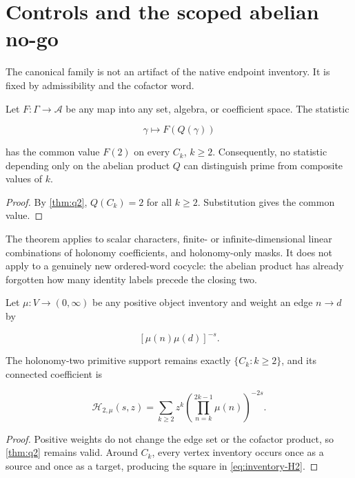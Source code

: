 \section{Controls and the scoped abelian no-go}
\label{sec:controls}

The canonical family is not an artifact of the native endpoint inventory.
It is fixed by admissibility and the cofactor word.

\begin{theorem}
\label{thm:blindness}
Let \(F:\Gamma\to\mathcal A\) be any map into any set, algebra, or
coefficient space.  The statistic

\[
 \gamma\longmapsto F(Q(\gamma))
\]

has the common value \(F(2)\) on every \(C_k\), \(k\ge2\).  Consequently, no
statistic depending only on the abelian product \(Q\) can distinguish prime
from composite values of \(k\).
\end{theorem}

\begin{proof}
By \cref{thm:q2}, \(Q(C_k)=2\) for all \(k\ge2\).  Substitution gives the
common value.
\end{proof}

The theorem applies to scalar characters, finite- or infinite-dimensional
linear combinations of holonomy coefficients, and holonomy-only masks.
It does not apply to a genuinely new ordered-word cocycle: the abelian
product has already forgotten how many identity labels precede the closing
two.

\begin{proposition}
\label{prop:inventory}
Let \(\mu:V\to(0,\infty)\) be any positive object inventory and weight an
edge \(n\to d\) by

\[
 [\mu(n)\mu(d)]^{-s}.
\]

The holonomy-two primitive support remains exactly
\(\{C_k:k\ge2\}\), and its connected coefficient is

\begin{equation}
 \mathcal H_{2,\mu}(s,z)=
 \sum_{k\ge2}z^k
 \left(\prod_{n=k}^{2k-1}\mu(n)\right)^{-2s}.
\label{eq:inventory-H2}
\end{equation}
\end{proposition}

\begin{proof}
Positive weights do not change the edge set or the cofactor product, so
\cref{thm:q2} remains valid.  Around \(C_k\), every vertex inventory occurs
once as a source and once as a target, producing the square in
\cref{eq:inventory-H2}.
\end{proof}

